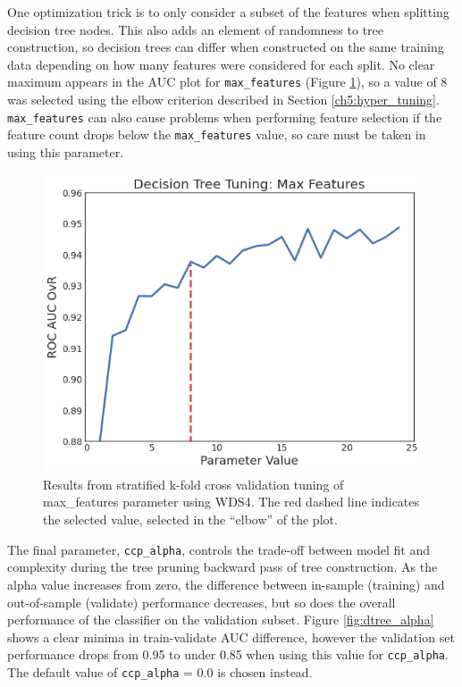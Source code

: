 One optimization trick is to only consider a subset of the features when splitting decision tree nodes. This also adds an element of randomness to tree construction, so decision trees can differ when constructed on the same training data depending on how many features were considered for each split. No clear maximum appears in the AUC plot for \verb|max_features| (Figure \ref{fig:dtree_max_features}), so a value of 8 was selected using the elbow criterion described in Section \ref{ch5:hyper_tuning}. \verb|max_features| can also cause problems when performing feature selection if the feature count drops  below the \verb|max_features| value, so care must be taken in using this parameter.

\begin{figure}[!htp]
\centering
\includegraphics[width=.6\textwidth]{templates/images/Figure-DT_tuning_max_features.png}
\caption[Decision tree max features tuning]{Results from stratified k-fold cross validation tuning of max\_features parameter using WDS4. The red dashed line indicates the selected value, selected in the “elbow” of the plot.}
\label{fig:dtree_max_features}
\end{figure}

The final parameter, \verb|ccp_alpha|, controls the trade-off between model fit and complexity during the tree pruning backward pass of tree construction. As the alpha value increases from zero, the difference between in-sample (training) and out-of-sample (validate) performance decreases, but so does the overall performance of the classifier on the validation subset. Figure \ref{fig:dtree_alpha} shows a clear minima in train-validate AUC difference, however the validation set performance drops from 0.95 to under 0.85 when using this value for \verb|ccp_alpha|. The default value of \verb|ccp_alpha| = 0.0 is chosen instead.

